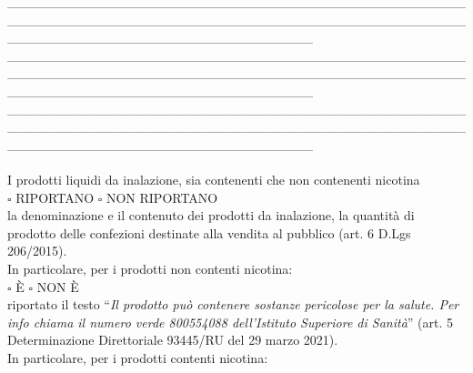 \documentclass[12pt]{article}
\begin{document}
\_\_\_\_\_\_\_\_\_\_\_\_\_\_\_\_\_\_\_\_\_\_\_\_\_\_\_\_\_\_\_\_\_\_\_\_\_\_\_\_\_\_\_\_\_\_\_\_\_\_\_\_\_\_\_\_\_\_\_\_\_\_\_\_\_\_\_\_\_\_\_\_\_\_\_\_\_\_\_\_\_\_\_\_\_\_\_\_\_\_\_\_\_\_\_\_\_\_\_\_\_\_\_\_\_\_\_\_\_\_\_\_\_\_\_\_\_\_\_\_\_\_\_\_\_\_\_\_ \\
\_\_\_\_\_\_\_\_\_\_\_\_\_\_\_\_\_\_\_\_\_\_\_\_\_\_\_\_\_\_\_\_\_\_\_\_\_\_\_\_\_\_\_\_\_\_\_\_\_\_\_\_\_\_\_\_\_\_\_\_\_\_\_\_\_\_\_\_\_\_\_\_\_\_\_\_\_\_\_\_\_\_\_\_\_\_\_\_\_\_\_\_\_\_\_\_\_\_\_\_\_\_\_\_\_\_\_\_\_\_\_\_\_\_\_\_\_\_\_\_\_\_\_\_\_\_\_\_ \\
\_\_\_\_\_\_\_\_\_\_\_\_\_\_\_\_\_\_\_\_\_\_\_\_\_\_\_\_\_\_\_\_\_\_\_\_\_\_\_\_\_\_\_\_\_\_\_\_\_\_\_\_\_\_\_\_\_\_\_\_\_\_\_\_\_\_\_\_\_\_\_\_\_\_\_\_\_\_\_\_\_\_\_\_\_\_\_\_\_\_\_\_\_\_\_\_\_\_\_\_\_\_\_\_\_\_\_\_\_\_\_\_\_\_\_\_\_\_\_\_\_\_\_\_\_\_\_\_ \\
\\
I prodotti liquidi da inalazione, sia contenenti che non contenenti nicotina \\
\begin{math}\square\end{math} RIPORTANO \begin{math}\square\end{math} NON RIPORTANO\\
la denominazione e il contenuto dei prodotti da inalazione, la quantità di prodotto delle confezioni destinate alla vendita al pubblico (art. 6 D.Lgs 206/2015).\\
In particolare, per i prodotti non contenti nicotina:\\
\begin{math}\square\end{math} È \begin{math}\square\end{math} NON È\\
riportato il testo “\textit{Il prodotto può contenere sostanze pericolose per la salute. Per info chiama il numero verde 800554088 dell’Istituto Superiore di Sanità}” (art. 5 Determinazione Direttoriale 93445/RU del 29 marzo 2021).\\
In particolare, per i prodotti contenti nicotina:
\end{document}
